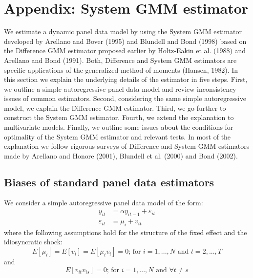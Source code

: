 
\newpage
\section*{Appendix: System GMM estimator}
\label{systemGMM}

We estimate a dynamic panel data model by using the System GMM estimator developed by Arellano and Bover (1995) and Blundell and Bond (1998) based on the Difference GMM estimator proposed earlier by Holtz-Eakin et al. (1988) and Arellano and Bond (1991). Both, Difference and System GMM estimators are specific applications of the generalized-method-of-moments (Hansen, 1982). In this section we explain the underlying details of the estimator in five steps. First, we outline a simple autoregressive panel data model and review inconsistency issues of common estimators. Second, considering the same simple autoregressive model, we explain the Difference GMM estimator. Third, we go further to construct the System GMM estimator. Fourth, we extend the explanation to multivariate models. Finally, we outline some issues about the conditions for optimality of the System GMM estimator and relevant tests. In most of the explanation we follow rigorous surveys of Difference and System GMM estimators made by Arellano and Honore (2001), Blundell et al. (2000) and Bond (2002).

\subsection*{Biases of standard panel data estimators}

We consider a simple autoregressive panel data model of the form:
\begin{equation}
\label{modelar}
\tag{1'}
\begin{aligned}
y_{it}&=\alpha y_{it-1} + \varepsilon_{it}\\
\varepsilon_{it}&=\mu _{i}+v_{it}
\end{aligned}
\end{equation}
where the following assumptions hold for the structure of the fixed effect and the idiosyncratic shock:
\begin{equation}
\label{as1}
\tag{2'}
E\left[\mu_{i}\right]=E\left[v_{i}\right]=E\left[\mu_{i}v_i\right]=0\text{; for $i=1,...,N$ and $t=2,...,T$}
\end{equation}
and
\begin{equation}
\label{as2}
\tag{3'}
E\left[v_{it}v_{is}\right]=0\text{; for $i=1,...,N$ and $\forall t\neq s$}
\end{equation}

